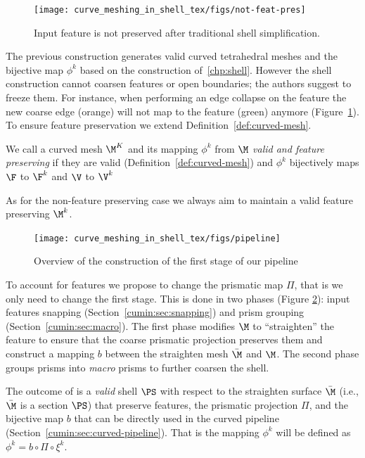 \begin{figure}
    \centering
    \texttt{[image: curve\_meshing\_in\_shell\_tex/figs/not-feat-pres]}
    \caption{Input feature is not preserved after traditional shell simplification.}
    \label{bichon:fig:not-feat-pres}
\end{figure}

The previous construction generates valid curved tetrahedral meshes and the bijective map $\phi^k$ based on the construction of~\ref{chp:shell}. However the shell construction cannot coarsen features or open boundaries; the authors suggest to freeze them. For instance, when performing an edge collapse on the feature the new coarse edge (orange) will not map to the feature (green) anymore (Figure~\ref{bichon:fig:not-feat-pres}). 
To ensure feature preservation we extend Definition~\ref{def:curved-mesh}.
\begin{definition}\label{def:curved-features}
We call a curved mesh $\M^K$ and its mapping $\phi^k$ from $\M$ \emph{valid and feature preserving} if they are valid (Definition~\ref{def:curved-mesh}) and $\phi^k$ bijectively maps $\F$ to $\F^k$ and $\V$ to $\V^k$
\end{definition}
As for the non-feature preserving case we always aim to maintain a valid feature preserving $\M^k$.


\begin{figure}
    \centering
    \texttt{[image: curve\_meshing\_in\_shell\_tex/figs/pipeline]}
    \caption{Overview of the construction of the first stage of our pipeline}
    \label{bichon:fig:stage-1}
\end{figure}

To account for features we propose to change the prismatic map $\Pi$, that is we only need to change the first stage. This is done in two phases (Figure \ref{bichon:fig:stage-1}): input features snapping (Section~\ref{cumin:sec:snapping}) and prism grouping (Section~\ref{cumin:sec:macro}). The first phase modifies $\M$ to ``straighten'' the feature to ensure that the coarse prismatic projection preserves them and construct a mapping $b$ between the straighten mesh $\bar\M$ and $\M$. The second phase groups prisms into \emph{macro} prisms to further coarsen the shell.

The outcome of is a \emph{valid} shell $\PS$ with respect to the straighten surface $\bar\M$ (i.e., $\bar\M$ is a section $\PS$) that preserve features, the prismatic projection $\Pi$, and the bijective map $b$ that can be directly used in the curved pipeline (Section~\ref{cumin:sec:curved-pipeline}). That is the mapping  $\phi^k$ will be defined as $\phi^k = b \circ \Pi \circ \xi^k$.


